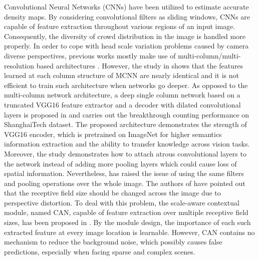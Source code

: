 \documentclass[10pt, conference, a4paper]{IEEEtran}
\begin{document}
Convolutional Neural Networks (CNNs) have been utilized to estimate accurate density maps. By considering convolutional filters as sliding windows, CNNs are capable of feature extraction throughout various regions of an input image. Consequently, the diversity of crowd distribution in the image is handled more properly. In order to cope with head scale variation problems caused by camera diverse perspectives, previous works mostly make use of multi-column/multi-resolution based architectures \cite{zhang2016single, onoro2016towards, cao2018scale, wu2019adaptive}. However, the study in \cite{li2018csrnet} shows that the features learned at each column structure of MCNN \cite{zhang2016single} are nearly identical and it is not efficient to train such architecture when networks go deeper. As opposed to the multi-column network architecture, a deep single column network based on a truncated VGG16 \cite{simonyan2014very} feature extractor and a decoder with dilated convolutional layers is proposed in \cite{li2018csrnet} and carries out the breakthrough counting performance on ShanghaiTech \cite{zhang2016single} dataset. The proposed architecture demonstrates the strength of VGG16 encoder, which is pretrained on ImageNet \cite{deng2009imagenet} for higher semantics information extraction and the ability to transfer knowledge across vision tasks. Moreover, the study demonstrates how to attach atrous convolutional layers to the network instead of adding more pooling layers which could cause loss of spatial information. Nevertheless, \cite{liu2019context} has raised the issue of using the same filters and pooling operations over the whole image. The authors of \cite{liu2019context} have pointed out that the receptive field size should be changed across the image due to perspective distortion. To deal with this problem, the scale-aware contextual module, named CAN, capable of feature extraction over multiple receptive field sizes, has been proposed in \cite{liu2019context}. By the module design, the importance of each such extracted feature at every image location is learnable. However, CAN contains no mechanism to reduce the background noise, which possibly causes false predictions, especially when facing sparse and complex scenes.
\end{document}
